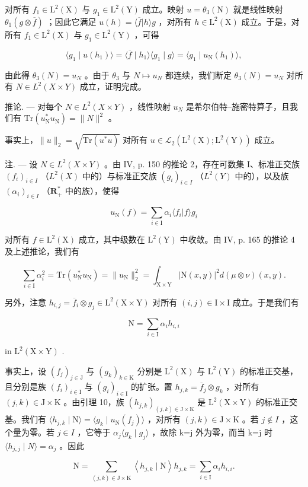 对所有 \(f_1 \in \mathrm{L}^2(\mathrm{X})\) 与 \(g_1 \in \mathrm{L}^2(\mathrm{Y})\) 成立。映射 \(u = \theta_3(\mathrm{N})\) 就是线性映射 \(\theta_1(g \otimes \overline{f})\) ；因此它满足 \(u(h) = \langle \overline{f} | h \rangle g\) ，对所有 \(h \in \mathrm{L}^2(\mathrm{X})\) 成立。于是，对所有 \(f_1 \in \mathrm{L}^2(\mathrm{X})\) 与 \(g_1 \in \mathrm{L}^2(\mathrm{Y})\) ，可得

\[
\langle g _ {1} \mid u (h _ {1}) \rangle = \langle \overline {{f}} \mid h _ {1} \rangle \langle g _ {1} \mid g \rangle = \langle g _ {1} \mid u _ {\mathrm{N}} (h _ {1}) \rangle ,
\]

由此得 \(\theta_3(N) = u_N\) 。由于 \(\theta_3\) 与 \(N \mapsto u_N\) 都连续，我们断定 \(\theta_3(N) = u_N\) 对所有 \(N \in L^2(X \times Y)\) 成立，证明完成。

推论. --- 对每个 \(N \in L^{2}(X \times Y)\) ，线性映射 \(u_{N}\) 是希尔伯特--施密特算子，且我们有 \(\mathrm{Tr}(u_{\mathrm{N}}^{*}u_{\mathrm{N}}) = \|N\|^{2}\) 。

事实上，\(\| u\| _2 = \sqrt{\mathrm{Tr}(u^*u)}\) 对所有 \(u\in \mathcal{L}_2(\mathrm{L}^2 (\mathrm{X});\mathrm{L}^2 (\mathrm{Y}))\) 成立。

注. --- 设 \(N \in L^{2}(X \times Y)\) 。由 IV, p. 150 的推论 2，存在可数集 I、标准正交族 \((f_{i})_{i \in I}\) （\(L^{2}(X)\) 中的）与标准正交族 \((g_{i})_{i \in I}\) （\(L^{2}(Y)\) 中的），以及族 \((\alpha_{i})_{i \in I}\) （\(\mathbf{R}_{+}^{*}\) 中的族），使得

\[
u _ {\mathrm{N}} (f) = \sum_ {i \in \mathrm{I}} \alpha_ {i} \langle f _ {i} | f \rangle g _ {i}
\]

对所有 \(f \in \mathrm{L}^2(\mathrm{X})\) 成立，其中级数在 \(\mathrm{L}^2(\mathrm{Y})\) 中收敛。由 IV, p. 165 的推论 4 及上述推论，我们有

\[
\sum_ {i \in \mathrm{I}} \alpha_ {i} ^ {2} = \mathrm{Tr} (u _ {\mathrm{N}} ^ {*} u _ {\mathrm{N}}) = \| u _ {\mathrm{N}} \| _ {2} ^ {2} = \int_ {\mathrm{X} \times \mathrm{Y}} | \mathrm{N} (x, y) | ^ {2} d (\mu \otimes \nu) (x, y).
\]

另外，注意 \(h_{i,j} = \overline{f}_{i} \otimes g_{j} \in \mathrm{L}^{2}(\mathrm{X} \times \mathrm{Y})\) 对所有 \((i, j) \in \mathrm{I} \times \mathrm{I}\) 成立。于是我们有

\[
\mathrm{N} = \sum_ {i \in \mathrm{I}} \alpha_ {i} h _ {i, i}
\]

in \(\mathrm{L}^2 (\mathrm{X}\times \mathrm{Y})\) .

事实上，设 \((f_{j})_{j\in\mathrm{J}}\) 与 \((g_{k})_{k\in\mathrm{K}}\) 分别是 \(\mathrm{L}^{2}(\mathrm{X})\) 与 \(\mathrm{L}^{2}(\mathrm{Y})\) 的标准正交基，且分别是族 \((f_{i})_{i\in\mathrm{I}}\) 与 \((g_{i})_{i\in\mathrm{I}}\) 的扩张。置 \(h_{j,k}=\overline{f}_{j}\otimes g_{k}\) ，对所有 \((j,k)\in\mathrm{J}\times\mathrm{K}\) 。由引理 10，族 \((h_{j,k})_{(j,k)\in\mathrm{J}\times\mathrm{K}}\) 是 \(\mathrm{L}^{2}(\mathrm{X}\times\mathrm{Y})\) 的标准正交基。我们有 \(\langle h_{j,k}\mid\mathrm{N}\rangle=\langle g_{k}\mid u_{\mathrm{N}}(f_{j})\rangle\) ，对所有 \((j,k)\in\mathrm{J}\times\mathrm{K}\) 。若 \(j\notin I\) ，这个量为零。若 \(j\in I\) ，它等于 \(\alpha_{j}\langle g_{k}\mid g_{j}\rangle\) ，故除 k=j 外为零，而当 k=j 时 \(\langle h_{j,j}\mid N\rangle=\alpha_{j}\) 。因此

\[
\mathrm{N} = \sum_ {(j, k) \in \mathrm{J} \times \mathrm{K}} \left\langle h _ {j, k} \mid \mathrm{N} \right\rangle h _ {j, k} = \sum_ {i \in \mathrm{I}} \alpha_ {i} h _ {i, i}.
\]

